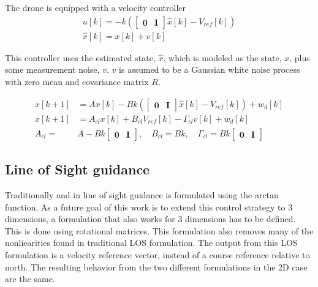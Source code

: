 The drone is equipped with a velocity controller
\begin{align}
    u[k] = - k ( \begin{bmatrix} \mathbf{0} & \mathbf{I} \end{bmatrix} \hat{x}[k] - V_{ref}[k] )\\
    \hat{x}[k] = x[k] + v[k]
\end{align}

This controller uses the estimated state, $\hat{x}$, which is modeled as the state, $x$, plus some measurement noise, $v$. $v$ is assumed to be a Gaussian white noise process with zero mean and covariance matrix $R$. 

\begin{align}
    x[k+1] & = A x[k] - B k (\begin{bmatrix} \mathbf{0} & \mathbf{I} \end{bmatrix} \hat{x}[k] - V_{ref}[k]) + w_d[k] \\
    x[k+1] & = A_{cl} x[k] + B_{cl} V_{ref}[k] - \Gamma_{cl} v[k] + w_d[k] \\
    A_{cl}  = &A - B k \begin{bmatrix} \mathbf{0} & \mathbf{I} \end{bmatrix}, \quad B_{cl} = B k, \quad \Gamma_{cl} = B k \begin{bmatrix} \mathbf{0} & \mathbf{I} \end{bmatrix}
\end{align}

\subsection{Line of Sight guidance}

Traditionally and in \cite{Johansen2016} line of sight guidance is formulated using the arctan function. As a future goal of this work is to extend this control strategy to 3 dimensions, a formulation that also works for 3 dimensions has to be defined. This is done using rotational matrices. This formulation also removes many of the nonliearities found in traditional LOS formulation. The output from this LOS formulation is a velocity reference vector, instead of a course reference relative to north. The resulting behavior from the two different formulations in the 2D case are the same. 



